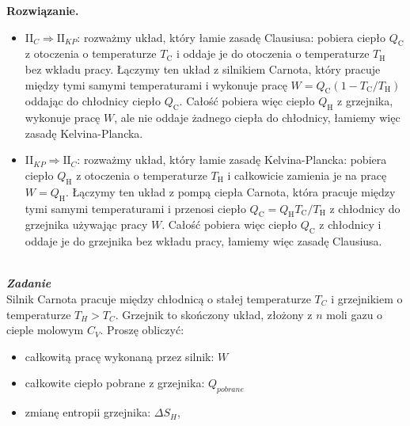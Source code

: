 \documentclass[11pt,a4paper]{article}
\newcounter{zadanie}\newcommand{\zadanie}[1][]{\addtocounter{zadanie}{1} ~\\ {\bf \emph{Zadanie \arabic{zadanie} #1 }} \\}
\newenvironment{solution}{\vspace{1cm} \par\textbf{Rozwiązanie.} \vspace{1cm}}{}
\begin{document}
\begin{solution}
\begin{itemize}
  co łamie II$_{S}$.

\vskip 0.5cm

 \item II$_{C} \Rightarrow \text{II}_{KP}$:
 rozważmy układ, który łamie zasadę Clausiusa: pobiera ciepło $Q_\text{C}$ 
 z otoczenia o temperaturze $T_\text{C}$ i oddaje je do otoczenia 
 o temperaturze $T_\text{H}$ bez wkładu pracy. Łączymy ten układ z 
 silnikiem Carnota, który pracuje między tymi samymi temperaturami i wykonuje 
 pracę $W = Q_\text{C} (1 - T_\text{C}/T_\text{H})$ oddając do chłodnicy 
 ciepło $Q_\text{C}$. Całość pobiera więc ciepło $Q_\text{H}$ 
 z grzejnika, wykonuje pracę $W$, ale nie oddaje żadnego ciepła do chłodnicy,
 łamiemy więc zasadę Kelvina-Plancka.

\begin{center}
\CarnotEngineDiagramA
\end{center}

\newpage

 \item II$_{KP} \Rightarrow \text{II}_{C}$:
  rozważmy układ, który łamie zasadę Kelvina-Plancka: pobiera ciepło $Q_\text{H}$ 
  z otoczenia o temperaturze $T_\text{H}$ i całkowicie zamienia je na pracę 
  $W = Q_\text{H}$. Łączymy ten układ z pompą ciepła Carnota, która pracuje 
  między tymi samymi temperaturami i przenosi ciepło 
  $Q_\text{C} = Q_\text{H} T_\text{C}/T_\text{H}$ z chłodnicy do grzejnika
  używając pracy $W$. Całość pobiera więc ciepło $Q_\text{C}$ z chłodnicy 
  i oddaje je do grzejnika bez wkładu pracy, łamiemy więc zasadę Clausiusa.

\begin{center}
\CarnotEngineDiagramB
\end{center}

\end{itemize}

\newpage   
\end{solution}
\zadanie[]

Silnik Carnota pracuje między chłodnicą o stałej temperaturze $T_C$ i grzejnikiem
o temperaturze $T_H > T_C$. Grzejnik to skończony układ, złożony z 
$n$ moli gazu o cieple molowym $C_V$. Proszę obliczyć:
\begin{itemize}
   \item całkowitą pracę wykonaną przez silnik: $W$
  \item całkowite ciepło pobrane z grzejnika: $Q_{pobrane}$
  \item zmianę entropii grzejnika: $\Delta S_{H}$,
\end{itemize}
\end{document}
